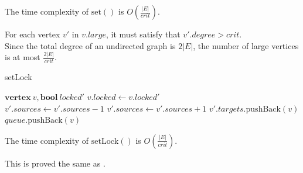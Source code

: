 \documentclass[12pt]{report}
\begin{document}
\begin{Lemma}
The time complexity of $ \mathrm{set}() $ is $ O(\frac{\lvert E \rvert}{\mathit{crit}}) $.
\label{thm:set}
\end{Lemma}
\begin{Proof}
	For each vertex $ v' $ in $ v.\mathit{large} $, it must satisfy that $ v'.\mathit{degree} > \mathit{crit} $. \\
	Since the total degree of an undirected graph is $ 2 \lvert E \rvert $, the number of large vertices is at most $ \frac{2 \lvert E \rvert}{\mathit{crit}} $.
\end{Proof}

\begin{algorithm}[H]
\caption {setLock}
\begin{algorithmic}
\Require $ \mathbf{vertex}\ v, \mathbf{bool}\ \mathit{locked}'$
	\State \Return
\EndIf
\State $ v.\mathit{locked} \gets v.\mathit{locked}' $
\\
			\State $ v'.\mathit{sources} \gets v'.\mathit{sources} - 1 $
		\EndFor
	\EndIf
\Else
			\State $ v'.\mathit{sources} \gets v'.\mathit{sources} + 1 $
		\EndFor
	\Else
			\State $ v'.\mathit{targets}.\mathrm{pushBack}(v) $
		\EndFor
	\EndIf
	\State $ \mathit{queue}.\mathrm{pushBack}(v) $
\EndIf
\end{algorithmic}
\end{algorithm}

\begin{Lemma}
The time complexity of $ \mathrm{setLock}() $ is $ O(\frac{\lvert E \rvert}{\mathit{crit}}) $.
\end{Lemma}
\begin{Proof}
This is proved the same as .
\end{Proof}
\end{document}
